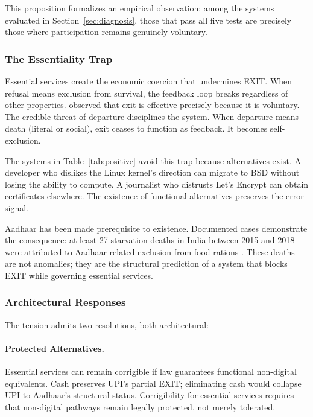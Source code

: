 This proposition formalizes an empirical observation: among the systems evaluated in Section~\ref{sec:diagnosis}, those that pass all five tests are precisely those where participation remains genuinely voluntary.

\subsubsection{The Essentiality Trap}

Essential services create the economic coercion that undermines EXIT. When refusal means exclusion from survival, the feedback loop breaks regardless of other properties. \citet{hirschman1970} observed that exit is effective precisely because it is voluntary. The credible threat of departure disciplines the system. When departure means death (literal or social), exit ceases to function as feedback. It becomes self-exclusion.

The systems in Table~\ref{tab:positive} avoid this trap because alternatives exist. A developer who dislikes the Linux kernel's direction can migrate to BSD without losing the ability to compute. A journalist who distrusts Let's Encrypt can obtain certificates elsewhere. The existence of functional alternatives preserves the error signal.

Aadhaar has been made prerequisite to existence. Documented cases demonstrate the consequence: at least 27 starvation deaths in India between 2015 and 2018 were attributed to Aadhaar-related exclusion from food rations \citep{khera2017}. These deaths are not anomalies; they are the structural prediction of a system that blocks EXIT while governing essential services.

\subsubsection{Architectural Responses}

The tension admits two resolutions, both architectural:

\paragraph{Protected Alternatives.} Essential services can remain corrigible if law guarantees functional non-digital equivalents. Cash preserves UPI's partial EXIT; eliminating cash would collapse UPI to Aadhaar's structural status. Corrigibility for essential services requires that non-digital pathways remain legally protected, not merely tolerated.

